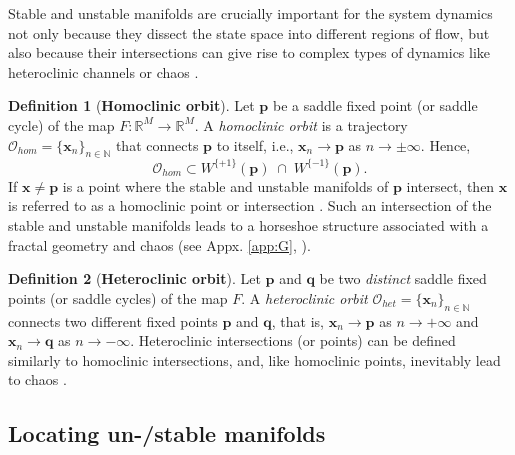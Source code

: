 \documentclass{article}
\theoremstyle{example}
\theoremstyle{plain}
\theoremstyle{definition}
\newtheorem{definition}{Definition}
\theoremstyle{remark}
\def\vp{{\bm{p}}}
\def\vq{{\bm{q}}}
\def\vx{{\bm{x}}}
\begin{document}
Stable and unstable manifolds are crucially important for the system dynamics not only because they dissect the state space into different regions of flow, but also because their intersections can give rise to complex types of dynamics like heteroclinic channels or chaos \citep{rabinovich2008transient,per}.
\begin{definition}[\textbf{Homoclinic orbit}]\label{def-hom}
Let $\vp$ be a saddle fixed point (or saddle cycle) of the map $F: \mathbb{R}^M \to \mathbb{R}^M$.
A \emph{homoclinic orbit} is a trajectory \( \mathcal{O}_{hom} =\{\vx_n\}_{n \in \mathbb{N}} \) that connects $\vp$ to itself, i.e., \( \vx_n \to \vp \) as \( n \to \pm \infty \). Hence,    
\[
\mathcal{O}_{hom} \subset W^{\{+1\}}( \vp ) \;\cap\; W^{\{-1\}}( \vp).
\]
If \( \vx \neq \vp \) is a point where the stable and unstable manifolds of $\vp$ intersect, then $\vx$ is referred to as a homoclinic point or intersection \citep{pat2,per}. Such an intersection of the stable and unstable manifolds leads to a horseshoe structure associated with a fractal geometry and chaos (see Appx. \ref{app:G},
\cite{wig}). 
\end{definition}

\begin{definition}[\textbf{Heteroclinic orbit}]\label{def-het}
Let $\vp$ and $\vq$ be two \emph{distinct} saddle fixed points (or saddle cycles) of the map $F$. A \emph{heteroclinic orbit} $\mathcal{O}_{het} =\{\vx_n\}_{n \in \mathbb{N}} $ connects two different fixed points \( \vp \) and \( \vq \), that is, \( \vx_n \to \vp \) as \( n \to +\infty \) and \( \vx_n \to \vq \) as \( n \to -\infty \). 
Heteroclinic intersections (or points) can be defined similarly to homoclinic intersections, and, like homoclinic points, inevitably lead to chaos \citep{wig,pat2}.
\end{definition}

\subsection{Locating un-/stable manifolds}\label{sec:manifold_constr}
\end{document}
